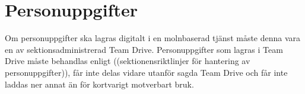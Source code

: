 \documentclass[10pt]{article}
\begin{document}
    \section{Personuppgifter}
    Om personuppgifter ska lagras digitalt i en molnbaserad tjänst måste denna vara en av sektionsadministrerad Team Drive. 
    Personuppgifter som lagras i Team Drive måste behandlas enligt ((sektionensriktlinjer för hantering av personuppgifter)), får inte delas vidare utanför sagda Team Drive och får inte laddas ner annat än för kortvarigt motverbart bruk.
\end{document}
